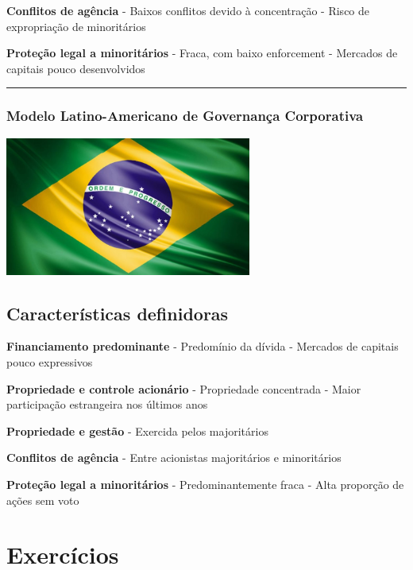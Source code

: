 \documentclass[
]{book}
\begin{document}
\textbf{Conflitos de agência} - Baixos conflitos devido à concentração - Risco de expropriação de minoritários

\textbf{Proteção legal a minoritários} - Fraca, com baixo enforcement - Mercados de capitais pouco desenvolvidos

\begin{center}\rule{0.5\linewidth}{0.5pt}\end{center}

\subsubsection{Modelo Latino-Americano de Governança Corporativa}\label{modelo-latino-americano-de-governanuxe7a-corporativa}

\includegraphics[width=3.1875in,height=\textheight]{images/02-2025-08-12_13/10-modelo_latino_americano.jpg}

\subsection{Características definidoras}\label{caracteruxedsticas-definidoras-4}

\textbf{Financiamento predominante} - Predomínio da dívida - Mercados de capitais pouco expressivos

\textbf{Propriedade e controle acionário} - Propriedade concentrada - Maior participação estrangeira nos últimos anos

\textbf{Propriedade e gestão} - Exercida pelos majoritários

\textbf{Conflitos de agência} - Entre acionistas majoritários e minoritários

\textbf{Proteção legal a minoritários} - Predominantemente fraca - Alta proporção de ações sem voto

\section{Exercícios}\label{exercuxedcios}
\end{document}
